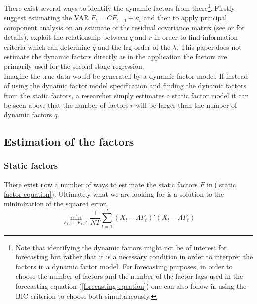 \documentclass[11pt]{article}
\begin{document}
There exist several ways to identify the dynamic factors from there\footnote{Note that identifying the dynamic factors might not be of interest for forecasting but rather that it is a necessary condition in order to interpret the factors in a dynamic factor model. For forecasting purposes, in order to choose the number of factors and the number of the factor lags used in the forecasting equation (\ref{forecasting equation}) one can also follow \citet{bai2008forecasting} in using the BIC criterion to choose both simultaneously. }. Firstly \citet{giannone2002tracking} suggest estimating the VAR $F_t = C F_{t-1} + \kappa_t$ and then to apply principal component analysis on an estimate of the residual covariance matrix (see \citet{breitung2004identification} or \citet{giannone2002tracking} for details). \citet{breitung2004identification} exploit the relationship between $q$ and $r$ in order to find information criteria which can determine $q$ and the lag order of the $\lambda$. This paper does not estimate the dynamic factors directly as in the application the factors are primarily used for the second stage regression. \\

Imagine the true data would be generated by a dynamic factor model. If instead of using the dynamic factor model specification and finding the dynamic factors from the static factors, a researcher simply estimates a static factor model it can be seen above that the number of factors $r$ will be larger than the number of dynamic factors $q$.

\subsection{Estimation of the factors}
\subsubsection{Static factors}
There exist now a number of ways to estimate the static factors $F$ in (\ref{static factor equation}). Ultimately what we are looking for is a solution to the minimization of the squared error.
\begin{equation}
	\label{factor equation minimization problem}
	\min_{F_1, ..., F_T, \Lambda} \frac{1}{NT} \sum_{t=1}^T (X_t - \Lambda F_t)'(X_t - \Lambda F_t)
\end{equation}
\end{document}
